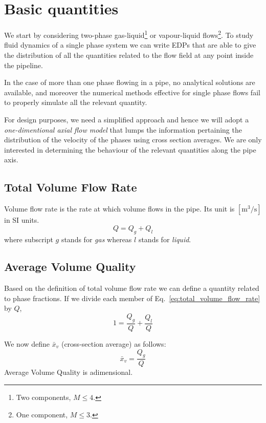 \section{Basic quantities}
We start by considering two-phase gas-liquid\footnote{Two components, $M \le
4$.} or vapour-liquid flows\footnote{One component, $M \le 3$.}. To study fluid
dynamics of a single phase system we can write EDPs that are able to give the
distribution of all the quantities related to the flow field at any point inside
the pipeline.

In the case of more than one phase flowing in a pipe, no analytical solutions
are available, and moreover the numerical methods effective for single phase
flows fail to properly simulate all the relevant quantity.

For design purposes, we need a simplified approach and hence we will adopt a
\emph{one-dimentional axial flow model} that lumps the information pertaining
the distribution of the velocity of the phases using cross section averages. We
are only interested in determining the behaviour of the relevant quantities
along the pipe axis.

\subsection{Total Volume Flow Rate}
Volume flow rate is the rate at which volume flows in the pipe. Its unit is
$[\si{\cubic\metre\per\second}]$ in SI units.
\begin{equation}
    Q = Q_g + Q_l
    \label{eq:total_volume_flow_rate}
\end{equation}
where subscript $g$ stands for \emph{gas} whereas $l$ stands for \emph{liquid}.

\subsection{Average Volume Quality}
Based on the definition of total volume flow rate we can define a quantity
related to phase fractions. If we divide each member of
Eq.~\ref{eq:total_volume_flow_rate} by $Q$,
\begin{equation*}
    1 = \frac{Q_g}{Q} + \frac{Q_l}{Q}
\end{equation*}

We now define $\bar{x}_v$ (cross-section average) as follows:
\begin{equation*}
    \bar{x}_v = \frac{Q_g}{Q}
\end{equation*}
Average Volume Quality is adimensional.

